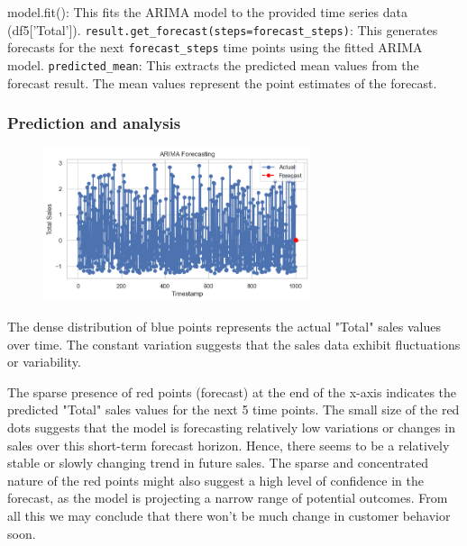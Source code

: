 model.fit(): This fits the ARIMA model to the provided time series data (df5['Total']).
\verb|result.get_forecast(steps=forecast_steps)|: This generates forecasts for the next \verb|forecast_steps| time points using the fitted ARIMA model.
\verb|predicted_mean|: This extracts the predicted mean values from the forecast result. The mean values represent the point estimates of the forecast.


\subsubsection{Prediction and analysis}

\begin{figure}[h]
    \centering
    \includegraphics[width=0.7\textwidth]{Chapters/ch6/ch_6_pred_and_analysis.png}
\end{figure}

The dense distribution of blue points represents the actual "Total" sales values over time. The constant variation suggests that the sales data exhibit fluctuations or variability.
\newline 

The sparse presence of red points (forecast) at the end of the x-axis indicates the predicted "Total" sales values for the next 5 time points. The small size of the red dots suggests that the model is forecasting relatively low variations or changes in sales over this short-term forecast horizon. Hence, there seems to be a relatively stable or slowly changing trend in future sales.
\newline 
The sparse and concentrated nature of the red points might also suggest a high level of confidence in the forecast, as the model is projecting a narrow range of potential outcomes.
\newline 
From all this we may conclude that there won’t be much change in customer behavior soon.

